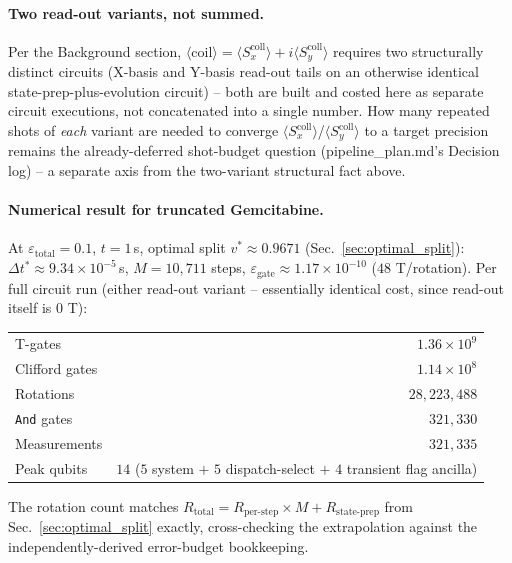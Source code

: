 \documentclass[11pt]{article}
\newcommand{\Dt}{\Delta t}
\begin{document}
\paragraph{Two read-out variants, not summed.} Per the Background section, $\langle\text{coil}\rangle=\langle S_x^{\text{coll}}\rangle+i\langle S_y^{\text{coll}}\rangle$ requires two structurally distinct circuits (X-basis and Y-basis read-out tails on an otherwise identical state-prep-plus-evolution circuit) -- both are built and costed here as separate circuit executions, not concatenated into a single number. How many repeated shots of \emph{each} variant are needed to converge $\langle S_x^{\text{coll}}\rangle$/$\langle S_y^{\text{coll}}\rangle$ to a target precision remains the already-deferred shot-budget question (pipeline\_plan.md's Decision log) -- a separate axis from the two-variant structural fact above.

\paragraph{Numerical result for truncated Gemcitabine.} At $\varepsilon_{\text{total}}=0.1$, $t=1\,$s, optimal split $v^\ast\approx0.9671$ (Sec.~\ref{sec:optimal_split}): $\Dt^\ast\approx9.34\times10^{-5}\,$s, $M=10{,}711$ steps, $\varepsilon_{\text{gate}}\approx1.17\times10^{-10}$ ($48$ T/rotation). Per full circuit run (either read-out variant -- essentially identical cost, since read-out itself is $0$ T):
\begin{center}
\begin{tabular}{@{}lr@{}}
\toprule
T-gates & $1.36\times10^9$ \\
Clifford gates & $1.14\times10^8$ \\
Rotations & $28{,}223{,}488$ \\
\texttt{And} gates & $321{,}330$ \\
Measurements & $321{,}335$ \\
Peak qubits & $14$ ($5$ system $+$ $5$ dispatch-select $+$ $4$ transient flag ancilla) \\
\bottomrule
\end{tabular}
\end{center}
The rotation count matches $R_{\text{total}}=R_{\text{per-step}}\times M+R_{\text{state-prep}}$ from Sec.~\ref{sec:optimal_split} exactly, cross-checking the extrapolation against the independently-derived error-budget bookkeeping.
\end{document}
